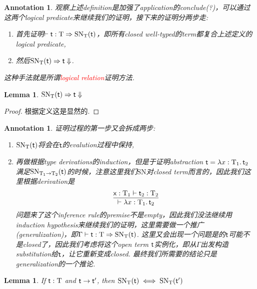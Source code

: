 \documentclass{article}
\theoremstyle{plain}
\newtheorem{lemma}[theorem]{Lemma}
\newtheorem{annotation}[theorem]{Annotation}
\theoremstyle{nonumberplain}
\newtheorem{proof}{Proof}
\newcommand{\lam}[2]{\ensuremath{\lambda #1\ldotp #2}} %
\newcommand{\singletype}[1]{\text{#1}}
\newcommand{\termtype}[2]{\ensuremath{#1:#2}}
\newcommand{\term}[1]{\ensuremath\mathsf{#1}}
\newcommand{\redt}[1]{\textcolor{red}{#1}}
\begin{document}
\begin{annotation}
\rm 观察上述definition是加强了application的conclude(?)，可以通过这两个logical predicate来继续我们的证明，接下来的证明分两步走:
\begin{enumerate}
	\item 首先证明$\vdash \termtype{\term{t}}{\singletype{T}} \Rightarrow \text{SN}_\singletype{T}(\term{t})$，即所有closed well-typed的term都复合上述定义的logical predicate,
	\item 然后$\text{SN}_\singletype{T}(\term{t}) \Rightarrow \term{t}\Downarrow$.
\end{enumerate}
这种手法就是所谓\redt{logical relation}证明方法. 
\end{annotation}

\begin{lemma}\label{logical predicate well-defined}
\rm $\text{SN}_\singletype{T}(\term{t}) \Rightarrow \term{t}\Downarrow$
\end{lemma}

\begin{proof}
根据定义这是显然的. 
\end{proof}

\begin{annotation}
\rm 证明过程的第一步又会拆成两步:
\begin{enumerate}
	\item $\text{SN}_\singletype{T}(\term{t})$将会在$\term{t}$的evalution过程中保持,
	\item 再做根据type derivations的induction，但是于证明abstraction $\term{t}=\lam{\termtype{x}{\singletype{T}_1}}{\term{t}_2}$满足$\text{SN}_{\singletype{T}_1 \to \singletype{T}_2}(\term{t})$的时候，注意这里我们$\text{SN}$对closed term而言的，因此我们这里根据derivation是
	$$
	\infer{\vdash \lam{\termtype{x}{\singletype{T}_1}}{\term{t}_2}}{\termtype{\term{x}}{\singletype{T}_1} \vdash \termtype{\term{t}_2}{\singletype{T}_2}}
	$$
	问题来了这个inference rule的premise不是empty，因此我们没法继续用induction hypothesis来继续我们的证明，这里需要做一个推广(generalization)，即$\Gamma	\vdash \termtype{\term{t}}{\singletype{T}} \Rightarrow \text{SN}_\singletype{T}(\term{t})$.  这里又会出现一个问题是的$\term{t}$可能不是closed了，因此我们考虑将这个open term $\term{t}$实例化，即从$\Gamma$出发构造substitution给$\term{t}$，让它重新变成closed. 最终我们所需要的结论只是generalization的一个推论.
\end{enumerate}
\end{annotation}

\begin{lemma}\label{logical predicate preserved under evalutaion}
\rm If $\termtype{\term{t}}{\singletype{T}}$ and $\term{t} \to \term{t}'$, then $\text{SN}_{\singletype{T}}(\term{t}) \iff \text{SN}_{\singletype{T}}(\term{t}')$ 
\end{lemma}
\end{document}
